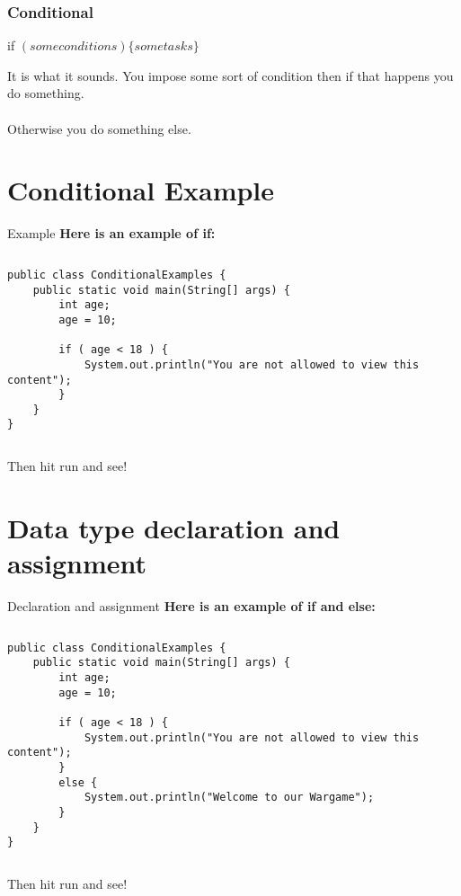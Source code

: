 \documentclass{beamer}
\begin{document}
\begin{frame}
\frametitle{Conditional}
\centerline{\huge{ if $( some conditions) \{  some tasks \}$  }}
\vspace{0.4in}
It is what it sounds. You impose some sort of condition then if that happens you do something.\\~\\
Otherwise you do something else.
\end{frame}

\section{Conditional Example}


\begin{frame}[fragile]{Example}
\textbf{Here is an example of if:}\\
\begin{columns}[T]
\begin{column}{\textwidth}
\begin{lstlisting}
public class ConditionalExamples {
    public static void main(String[] args) {
        int age;
        age = 10;

        if ( age < 18 ) {
            System.out.println("You are not allowed to view this content");
        }
    }
}
\end{lstlisting}
\end{column}
\end{columns}
\vspace{0.4in} Then hit run and see!
\end{frame}



\section{Data type declaration and assignment}

\begin{frame}[fragile]{ Declaration and assignment}
\textbf{Here is an example of if and else:}\\
\begin{columns}[T]
\begin{column}{\textwidth}
\begin{lstlisting}
public class ConditionalExamples {
    public static void main(String[] args) {
        int age;
        age = 10;

        if ( age < 18 ) {
            System.out.println("You are not allowed to view this content");
        }
        else {
            System.out.println("Welcome to our Wargame");
        }
    }
}
\end{lstlisting}
\end{column}
\end{columns}
\vspace{0.4in} Then hit run and see!
\end{frame}
\end{document}
